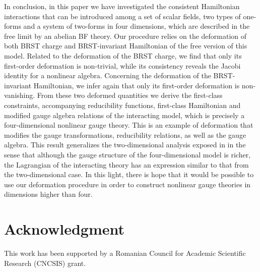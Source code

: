 \documentclass[a4paper,12pt]{article}
\begin{document}
In conclusion, in this paper we have investigated the consistent Hamiltonian
interactions that can be introduced among a set of scalar fields, two types
of one-forms and a system of two-forms in four dimensions, which are
described in the free limit by an abelian BF theory. Our procedure relies on
the deformation of both BRST charge and BRST-invariant Hamiltonian of the
free version of this model. Related to the deformation of the BRST charge,
we find that only its first-order deformation is non-trivial, while its
consistency reveals the Jacobi identity for a nonlinear algebra. Concerning
the deformation of the BRST-invariant Hamiltonian, we infer again that only
its first-order deformation is non-vanishing. From these two deformed
quantities we derive the first-class constraints, accompanying reducibility
functions, first-class Hamiltonian and modified gauge algebra relations of
the interacting model, which is precisely a four-dimensional nonlinear gauge
theory. This is an example of deformation that modifies the gauge
transformations, reducibility relations, as well as the gauge algebra. This
result generalizes the two-dimensional analysis exposed in \cite{mpla} in
the sense that although the gauge structure of the four-dimensional model is
richer, the Lagrangian of the interacting theory has an expression similar
to that from the two-dimensional case. In this light, there is hope that it
would be possible to use our deformation procedure in order to construct
nonlinear gauge theories in dimensions higher than four.

\section*{Acknowledgment}

This work has been supported by a Romanian Council for Academic Scientific
Research (CNCSIS) grant.
\end{document}
